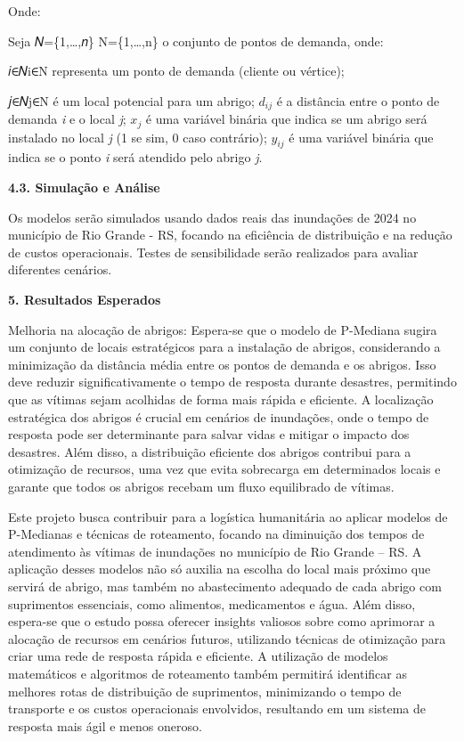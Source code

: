 \documentclass[
]{article}
\begin{document}
Onde:

Seja 𝑁=\{1,\ldots,𝑛\} N=\{1,\ldots,n\} o conjunto de pontos de demanda,
onde:

𝑖∈𝑁i∈N representa um ponto de demanda (cliente ou vértice);

𝑗∈𝑁j∈N é um local potencial para um abrigo; \(d_{ij}\) é a distância
entre o ponto de demanda \emph{i} e o local \emph{j}; \(x_{j}\) é uma
variável binária que indica se um abrigo será instalado no local
\emph{j} (1 se sim, 0 caso contrário); \(y_{ij}\) é uma variável binária
que indica se o ponto \emph{i} será atendido pelo abrigo \emph{j}.

\textbf{4.3. Simulação e Análise}

Os modelos serão simulados usando dados reais das inundações de 2024 no
município de Rio Grande - RS, focando na eficiência de distribuição e na
redução de custos operacionais. Testes de sensibilidade serão realizados
para avaliar diferentes cenários.

\textbf{5. Resultados Esperados}

Melhoria na alocação de abrigos: Espera-se que o modelo de P-Mediana
sugira um conjunto de locais estratégicos para a instalação de abrigos,
considerando a minimização da distância média entre os pontos de demanda
e os abrigos. Isso deve reduzir significativamente o tempo de resposta
durante desastres, permitindo que as vítimas sejam acolhidas de forma
mais rápida e eficiente. A localização estratégica dos abrigos é crucial
em cenários de inundações, onde o tempo de resposta pode ser
determinante para salvar vidas e mitigar o impacto dos desastres. Além
disso, a distribuição eficiente dos abrigos contribui para a otimização
de recursos, uma vez que evita sobrecarga em determinados locais e
garante que todos os abrigos recebam um fluxo equilibrado de vítimas.

Este projeto busca contribuir para a logística humanitária ao aplicar
modelos de P-Medianas e técnicas de roteamento, focando na diminuição
dos tempos de atendimento às vítimas de inundações no município de Rio
Grande -- RS. A aplicação desses modelos não só auxilia na escolha do
local mais próximo que servirá de abrigo, mas também no abastecimento
adequado de cada abrigo com suprimentos essenciais, como alimentos,
medicamentos e água. Além disso, espera-se que o estudo possa oferecer
insights valiosos sobre como aprimorar a alocação de recursos em
cenários futuros, utilizando técnicas de otimização para criar uma rede
de resposta rápida e eficiente. A utilização de modelos matemáticos e
algoritmos de roteamento também permitirá identificar as melhores rotas
de distribuição de suprimentos, minimizando o tempo de transporte e os
custos operacionais envolvidos, resultando em um sistema de resposta
mais ágil e menos oneroso.
\end{document}
